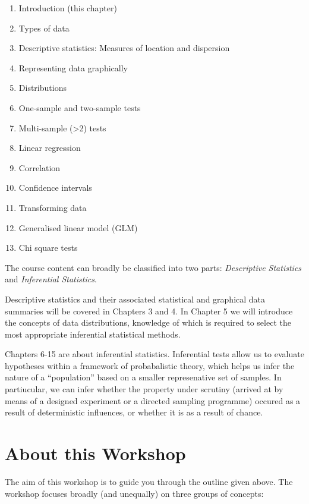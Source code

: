 \documentclass[english,10pt,a4paper,oneside]{book}
\providecommand{\tightlist}{%
  \setlength{\itemsep}{0pt}\setlength{\parskip}{0pt}}
\theoremstyle{definition}
\theoremstyle{definition}
\theoremstyle{definition}
\theoremstyle{remark}
\begin{document}
\begin{enumerate}
\def\labelenumi{\arabic{enumi}.}
\tightlist
\item
  Introduction (this chapter)
\item
  Types of data
\item
  Descriptive statistics: Measures of location and dispersion
\item
  Representing data graphically
\item
  Distributions
\item
  One-sample and two-sample tests
\item
  Multi-sample (\textgreater{}2) tests
\item
  Linear regression
\item
  Correlation
\item
  Confidence intervals
\item
  Transforming data
\item
  Generalised linear model (GLM)
\item
  Chi square tests
\end{enumerate}

The course content can broadly be classified into two parts:
\emph{Descriptive Statistics} and \emph{Inferential Statistics}.

Descriptive statistics and their associated statistical and graphical
data summaries will be covered in Chapters 3 and 4. In Chapter 5 we will
introduce the concepts of data distributions, knowledge of which is
required to select the most appropriate inferential statistical methods.

Chapters 6-15 are about inferential statistics. Inferential tests allow
us to evaluate hypotheses within a framework of probabalistic theory,
which helps us infer the nature of a \enquote{population} based on a
smaller represenative set of samples. In partiucular, we can infer
whether the property under scrutiny (arrived at by means of a designed
experiment or a directed sampling programme) occured as a result of
deterministic influences, or whether it is as a result of chance.

\hypertarget{about-this-workshop}{%
\section{About this Workshop}\label{about-this-workshop}}

The aim of this workshop is to guide you through the outline given
above. The workshop focuses broadly (and unequally) on three groups of
concepts:
\end{document}
